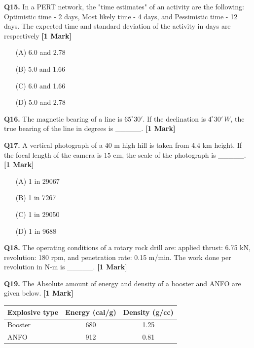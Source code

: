 \documentclass[11pt]{article}
\newcommand{\questiona}[2]{
    \noindent\textbf{Q#2.} #1 \hfill \textbf{[1 Mark]}
}
\begin{document}
\questiona{In a PERT network, the "time estimates" of an activity are the following: Optimistic time - 2 days, Most likely time - 4 days, and Pessimistic time - 12 days. The expected time and standard deviation of the activity in days are respectively}{15}
\begin{enumerate}
    \item[(A)] 6.0 and 2.78  
    \item[(B)] 5.0 and 1.66  
    \item[(C)] 6.0 and 1.66  
    \item[(D)] 5.0 and 2.78  
\end{enumerate}
\vspace{0.5cm}

\questiona{The magnetic bearing of a line is \( 65^\circ 30' \). If the declination is \( 4^\circ 30' \, W \), the true bearing of the line in degrees is \_\_\_\_\_.}{16}
\vspace{0.5cm}

\questiona{A vertical photograph of a 40 m high hill is taken from 4.4 km height. If the focal length of the camera is 15 cm, the scale of the photograph is \_\_\_\_\_.}{17}
\begin{enumerate}
    \item[(A)] 1 in 29067  
    \item[(B)] 1 in 7267  
    \item[(C)] 1 in 29050  
    \item[(D)] 1 in 9688  
\end{enumerate}
\vspace{0.5cm}

\questiona{The operating conditions of a rotary rock drill are: applied thrust: 6.75 kN, revolution: 180 rpm, and penetration rate: 0.15 m/min. The work done per revolution in N-m is \_\_\_\_\_.}{18}
\vspace{0.5cm}

\questiona{The Absolute amount of energy and density of a booster and ANFO are given below.}{19}

\begin{center}
\begin{tabular}{|l|c|c|}
\hline
Explosive type & Energy (cal/g) & Density (g/cc) \\
\hline
Booster & 680 & 1.25 \\
ANFO & 912 & 0.81 \\
\hline
\end{tabular}
\end{center}
\end{document}
